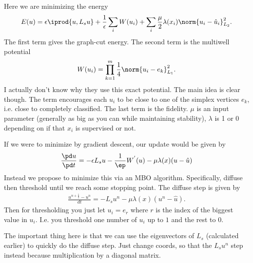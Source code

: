 \documentclass[12pt]{article}
\begin{document}
Here we are minimizing the energy
\begin{align}
  E(u) = \epsilon \iprod{u,L_s u} + \frac{1}{\epsilon}\sum_i W(u_i) + \sum_i \frac{\mu}{2}\lambda(x_i)\norm{u_i - \hat{u}_i}^2_{L_2}.
\end{align}
The first term gives the graph-cut energy. The second term is the multiwell potential
\begin{align}
  W(u_i) = \prod_{k=1}^{m}\frac{1}{4}\norm{u_i - e_k}_{L_1}^2.
\end{align}
I actually don't know why they use this exact potential. The main idea is clear though. The term encourages each $u_i$ to be close to one of the simplex vertices $e_k$, i.e. close to completely classified. The last term is the fidelity. $\mu$ is an input parameter (generally as big as you can while maintaining stability), $\lambda$ is 1 or 0 depending on if that $x_i$ is supervised or not.

If we were to minimize by gradient descent, our update would be given by
\begin{align}
  \frac{\pd u}{\pd t} = -\epsilon L_s u - \frac{1}{\ep}W^{'}(u) - \mu\lambda(x)(u-\hat{u})
\end{align}
Instead we propose to minimize this via an MBO algorithm. Specifically, diffuse then threshold until we reach some stopping point. The diffuse step is given by
\begin{align}
  \frac{u^{n+\frac{1}{2}}-u^n}{dt} = -L_s u^n - \mu \lambda(x) (u^n - \hat{u}).
\end{align}
Then for thresholding you just let $u_i = e_r$ where $r$ is the index of the biggest value in $u_i$. I.e. you threshold one number of $u_i$ up to $1$ and the rest to $0$.

The important thing here is that we can use the eigenvectors of $L_s$ (calculated earlier) to quickly do the diffuse step. Just change coords, so that the $L_s u^n$ step instead because multiplication by a diagonal matrix.
 
\end{document}
